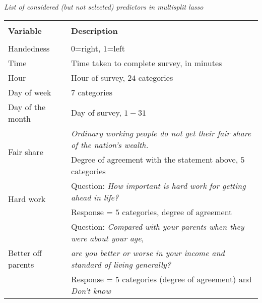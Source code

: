 \documentclass[a4paper,12pt]{article}
\begin{document}
{\centering
\begin{threeparttable}
\caption{\textit{\vspace{-0.3cm}List of considered (but not selected) predictors in multisplit lasso}}
\label{PotentialPredictors2} 
\centering
\begin{small}
\begin{tabular}{ll} 
\hline \vspace{-0.25cm} \\	
  \multicolumn{1}{l}{\vspace{0.1cm}\textbf{Variable}}&   \multicolumn{1}{l}{\vspace{0.1cm}\textbf{Description}}   \\ 
\hline \vspace{-0.35cm}\\ 
\vspace{0.14cm}Handedness& $0$=right, $1$=left \\
\vspace{0.14cm}Time&Time taken to complete survey, in minutes\\
\vspace{0.14cm}Hour&Hour of survey, $24$ categories\\
\vspace{0.14cm}Day of week&$7$ categories\\
\vspace{0.14cm}Day of the month&Day of survey, $1-31$\\
\multirow{2}{*}{Fair share}&\textit{Ordinary working people do not get their fair share of the nation's wealth.}\\
\vspace{0.14cm}&Degree of agreement with the statement above, $5$ categories\\
\multirow{2}{*}{Hard work}&Question: \textit{How important is hard work for getting ahead in life?}\\
\vspace{0.14cm}&Response = $5$ categories, degree of agreement\\
\multirow{3}{*}{Better off parents}&Question: \textit{Compared with your parents when they were about your age, }\\
&\textit{are you better or worse in your income and standard of living generally?}\\
\vspace{0.14cm}&Response = $5$ categories (degree of agreement)  and \textit{Don't know}\\

\end{tabular}
\end{small}
\end{threeparttable}}
\end{document}
